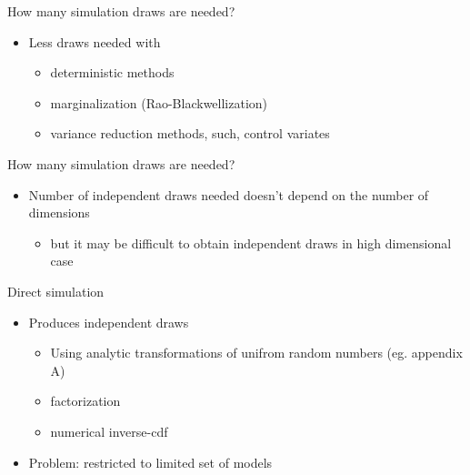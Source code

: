 \documentclass[finnish,english,t]{beamer}
\begin{document}
\begin{frame}
  
  {\Large\color{navyblue} How many simulation draws are needed?}

  \begin{itemize}
  \item Less draws needed with
    \begin{itemize}
    \item deterministic methods
    \item marginalization (Rao-Blackwellization)
    \item variance reduction methods, such, control variates
    \end{itemize}
  \end{itemize}

\end{frame}

\begin{frame}
  
  {\Large\color{navyblue} How many simulation draws are needed?}

  \begin{itemize}
  \item Number of independent draws needed doesn't depend on the number of dimensions
    \begin{itemize}
    \item but it may be difficult to obtain independent draws in high dimensional case
    \end{itemize}
  \end{itemize}

\end{frame}

\begin{frame}

  
  {\Large\color{navyblue} Direct simulation}

  \begin{itemize}
  \item Produces independent draws
    \begin{itemize}
    \item Using analytic transformations of unifrom random numbers
      (eg. appendix A)
    \item factorization
    \item numerical inverse-cdf
    \end{itemize}
  \item Problem: restricted to limited set of models
  \end{itemize}

\end{frame}
\end{document}
